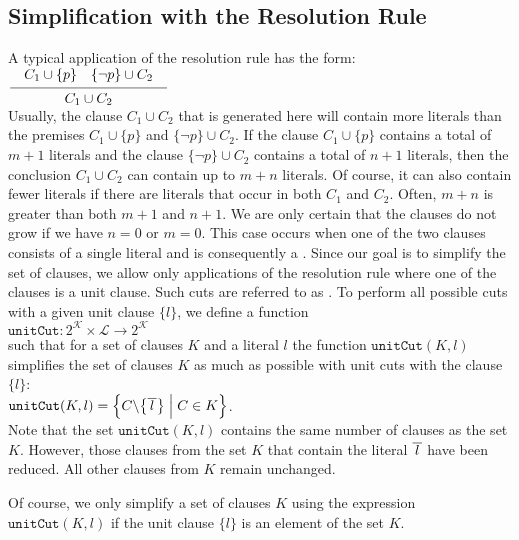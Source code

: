 \subsection{Simplification with the Resolution Rule}
A typical application of the resolution rule has the form: \\[0.2cm]
\hspace*{1.3cm} $\schluss{ C_1 \cup \{p\} \quad \{\neg p\} \cup C_2}{C_1 \cup C_2}$
\\[0.2cm]
Usually, the clause $C_1 \cup C_2$ that is  generated here will contain more literals
than the premises $C_1 \cup \{p\}$ and $\{\neg p\} \cup C_2$. If the
clause $C_1 \cup \{p\}$ contains a total of $m+1$ literals and the clause
$\{\neg p\} \cup C_2$ contains a total of $n+1$ literals, then the conclusion $C_1 \cup C_2$
can contain up to $m + n$ literals. Of course, it can also contain fewer literals
if there are literals that occur in both $C_1$ and $C_2$.
Often, $m + n$ is greater than both $m + 1$ and $n + 1$.  We are only certain that the clauses
do not grow if we have $n = 0$ or $m = 0$.
This case occurs when one of the two clauses consists  of a single literal
and is consequently a .  Since our goal is to simplify the set of clauses,
we allow only applications of the resolution rule where
one of the clauses is a unit clause. Such cuts are referred to as
. To perform all possible cuts with a given unit clause $\{l\}$,
we define a function
\\[0.2cm]
\hspace*{1.3cm}
$\texttt{unitCut}: 2^\mathcal{K} \times \mathcal{L} \rightarrow 2^\mathcal{K}$
\\[0.2cm]
such that for a set of clauses $K$ and a literal $l$ the function
$\texttt{unitCut}(K,l)$ simplifies the set of clauses $K$ as much as possible with unit cuts with the clause
$\{l\}$:
\\[0.2cm]
\hspace*{1.3cm}
$\texttt{unitCut}(K,l) = \Bigl\{ C \backslash \bigl\{ \overline{\,l\,} \bigr\} \;\Big|\; C \in K \Bigr\}$.
\\[0.2cm]
Note that the set $\texttt{unitCut}(K,l)$ contains the same number of clauses as the set
$K$. However, those clauses from the set $K$ that contain the literal $\overline{\,l\,}$
have been reduced. All other clauses from $K$ remain unchanged.

Of course, we only simplify a set of clauses $K$ using the expression $\texttt{unitCut}(K, l)$ if
the unit clause $\{l\}$ is an element of the set $K$.

